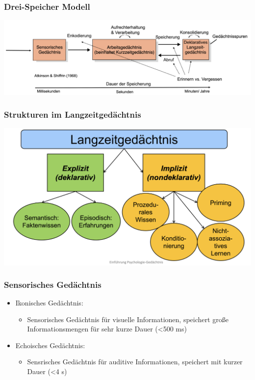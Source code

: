 \subsubsection{Drei-Speicher Modell}
\begin{center}
	\includegraphics[scale=.2]{img/Drei_Speicher.png}
\end{center}
\subsubsection{Strukturen im Langzeitgedächtnis}
\begin{center}
	\includegraphics[scale=.2]{img/Langzeitgedaechtnis.png}
\end{center}
\subsubsection{Sensorisches Gedächtnis}
\begin{itemize}
	\item Ikonisches Gedächtnis:
		\begin{itemize}
			\item Sensorisches Gedächtnis für visuelle Informationen, speichert große Informationsmengen für sehr kurze Dauer (<500 ms)  
		\end{itemize}
	\item Echoisches Gedächtnis:
		\begin{itemize}
			\item Sensrisches Gedächtnis für auditive Informationen, speichert mit kurzer Dauer (<4 s) 
		\end{itemize}	
\end{itemize}
